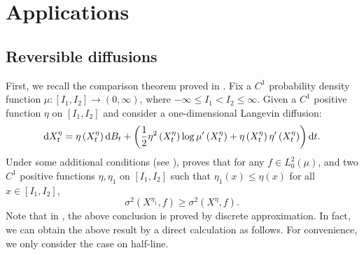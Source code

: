 \documentclass[12pt,reqno]{article}
\theoremstyle{definition}
\theoremstyle{remark}
\newtheorem{rem}[thm]{Remark}
\theoremstyle{example}
\numberwithin{equation}{section}
\def\d{\mathrm{d}}
\def\d{\rm d}
\def\lb{\label}
\def\d{{\mbox{\rm d}}}
\begin{document}




\section{Applications}\lb{sect-eg}
\subsection{Reversible  diffusions}\lb{Lang-rev}


 First, we recall the comparison theorem proved in \cite[Theorem 1]{RR14}.
Fix a $C^1$  probability density function $\mu:[I_1,I_2]\rightarrow (0,\infty)$,  where $-\infty\leq  I_1<I_2\leq\infty$.
 	Given a $C^1$ positive function $\eta$ on $[I_1,I_2]$ and consider a one-dimensional Langevin diffusion:
 	$$\d X^\eta_{t}=\eta\left(X^\eta_t\right) \d B_{t}+\left(\frac{1}{2} \eta^{2}\left(X^\eta_{t}\right) \log \mu^{\prime}\left(X^\eta_{t}\right)+\eta\left(X^\eta_{t}\right) \eta^{\prime}\left(X^\eta_{t}\right)\right) \d t.$$
 	Under some additional conditions (see \cite[Page 133]{RR14}), \cite{RR14} proves that for any $f\in L^2_0(\mu)$, and two $C^1$ positive functions $\eta,\eta_1$  on $[I_1,I_2]$ such that   $\eta_1(x)\leq \eta(x)$ for all $x\in[I_1,I_2]$, 	
 $$
 		\sigma^2(X^{\eta_1},f)\geq \sigma^2(X^{\eta},f).
$$
Note that in \cite{RR14}, the above conclusion is proved by discrete approximation. In fact, we can obtain the above result  by a direct calculation as follows. For convenience, we only consider the case on half-line.
\end{document}
